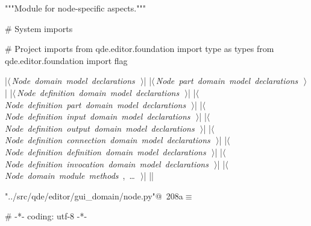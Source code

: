 \documentclass[%
    a4paper,    %
    justified,  %
    nobib,      %
    openany     %
]{tufte-book}
\makeatletter
\renewcommand{\label}[1]{\@tufte@label{##1}}%
\makeatother
\begin{document}
\begin{fullwidth}
\begin{flushleft}
\begin{minipage}{\linewidth}
\begin{pythoncode}
"""Module for node-specific aspects."""

# System imports

# Project imports
from qde.editor.foundation import type as types
from qde.editor.foundation import flag

|\hbox{$\langle\,${\itshape Node domain model declarations}\nobreak\ {\footnotesize {}}$\,\rangle$}|
|\hbox{$\langle\,${\itshape Node part domain model declarations}\nobreak\ {\footnotesize {}}$\,\rangle$}|
|\hbox{$\langle\,${\itshape Node definition domain model declarations}\nobreak\ {\footnotesize {}}$\,\rangle$}|
|\hbox{$\langle\,${\itshape Node definition part domain model declarations}\nobreak\ {\footnotesize {}}$\,\rangle$}|
|\hbox{$\langle\,${\itshape Node definition input domain model declarations}\nobreak\ {\footnotesize {}}$\,\rangle$}|
|\hbox{$\langle\,${\itshape Node definition output domain model declarations}\nobreak\ {\footnotesize {}}$\,\rangle$}|
|\hbox{$\langle\,${\itshape Node definition connection domain model declarations}\nobreak\ {\footnotesize {}}$\,\rangle$}|
|\hbox{$\langle\,${\itshape Node definition definition domain model declarations}\nobreak\ {\footnotesize {}}$\,\rangle$}|
|\hbox{$\langle\,${\itshape Node definition invocation domain model declarations}\nobreak\ {\footnotesize {}}$\,\rangle$}|
|\hbox{$\langle\,${\itshape Node domain module methods}\nobreak\ {\footnotesize {}, \ldots\ }$\,\rangle$}|
|\NWsep|
\end{pythoncode}
\vspace{1.5ex}
\footnotesize
\begin{list}{}{\setlength{\itemsep}{-\parsep}\setlength{\itemindent}{-\leftmargin}}

\item{}
\end{list}
\end{minipage}\vspace{4ex}
\end{flushleft}
\begin{flushleft} \small
\begin{minipage}{\linewidth}\label{scrap205}\raggedright\small
{} \verb@"../src/qde/editor/gui_domain/node.py"@\nobreak\ {\footnotesize {208a}}$\equiv$
\vspace{-1ex}
\begin{pythoncode}
# -*- coding: utf-8 -*-


\end{pythoncode}
\end{minipage}
\end{flushleft}
\end{fullwidth}
\end{document}
